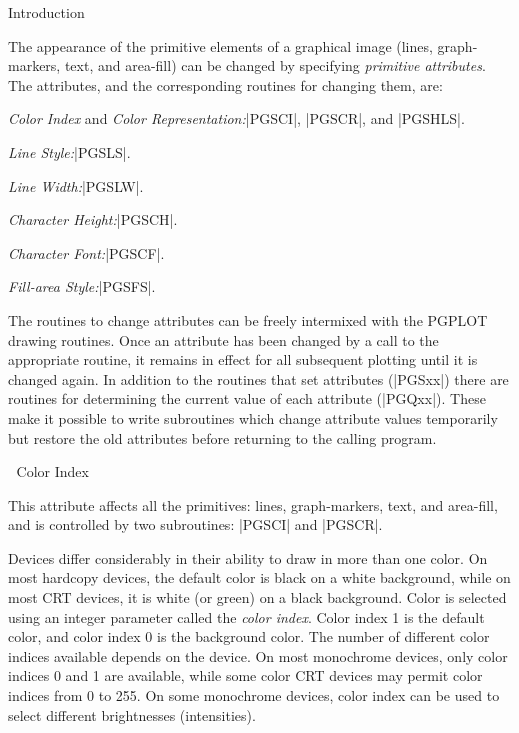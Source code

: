 

\beginsection Introduction

The appearance of the primitive elements of a graphical image
(lines, graph-markers, text, and area-fill) can be changed by specifying
{\it primitive attributes}.  The attributes, and the corresponding
routines for changing them, are: 

{\it Color Index\/} and {\it Color Representation:}\quad |PGSCI|, 
|PGSCR|, and |PGSHLS|.

{\it Line Style:}\quad |PGSLS|.

{\it Line Width:}\quad |PGSLW|.

{\it Character Height:}\quad |PGSCH|.

{\it Character Font:}\quad |PGSCF|.

{\it Fill-area Style:}\quad |PGSFS|. 

The routines to change attributes can be freely intermixed with the
PGPLOT drawing routines. Once an attribute has been changed by a call to
the appropriate routine, it remains in effect for all subsequent
plotting until it is changed again.  In addition to the routines that
set attributes (|PGSxx|) there are routines for determining the current
value of each attribute (|PGQxx|). These make it possible to write
subroutines which change attribute values temporarily but restore the
old attributes before returning to the calling program. 


\beginsection Color Index

This attribute affects all the primitives: lines, graph-markers, text,
and area-fill, and is controlled by two subroutines: |PGSCI| and
|PGSCR|. 

Devices differ considerably in their ability to draw in more than one 
color.  On most hardcopy devices, the default color is black on a white 
background, while on most CRT devices, it is white (or green) on a black
background.  Color is selected using an integer parameter called the
{\it color index}.  Color index 1 is the default color, and color
index 0 is the background color.  The number of different color indices
available depends on the device. On most monochrome devices, only color 
indices 0 and 1 are available, while some color CRT devices may permit color
indices from 0 to 255.  On some monochrome devices, color index can be 
used to select different brightnesses (intensities).

